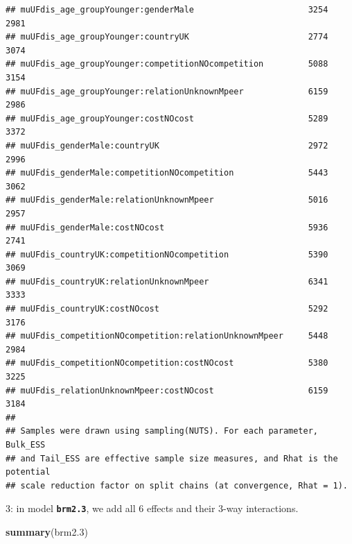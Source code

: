 \documentclass[
]{article}
\newenvironment{Shaded}{\begin{snugshade}}{\end{snugshade}}
\newcommand{\FloatTok}[1]{\textcolor[rgb]{0.00,0.00,0.81}{#1}}
\newcommand{\KeywordTok}[1]{\textcolor[rgb]{0.13,0.29,0.53}{\textbf{#1}}}
\newcommand{\NormalTok}[1]{#1}
\begin{document}
\begin{verbatim}
## muUFdis_age_groupYounger:genderMale                       3254     2981
## muUFdis_age_groupYounger:countryUK                        2774     3074
## muUFdis_age_groupYounger:competitionNOcompetition         5088     3154
## muUFdis_age_groupYounger:relationUnknownMpeer             6159     2986
## muUFdis_age_groupYounger:costNOcost                       5289     3372
## muUFdis_genderMale:countryUK                              2972     2996
## muUFdis_genderMale:competitionNOcompetition               5443     3062
## muUFdis_genderMale:relationUnknownMpeer                   5016     2957
## muUFdis_genderMale:costNOcost                             5936     2741
## muUFdis_countryUK:competitionNOcompetition                5390     3069
## muUFdis_countryUK:relationUnknownMpeer                    6341     3333
## muUFdis_countryUK:costNOcost                              5292     3176
## muUFdis_competitionNOcompetition:relationUnknownMpeer     5448     2984
## muUFdis_competitionNOcompetition:costNOcost               5380     3225
## muUFdis_relationUnknownMpeer:costNOcost                   6159     3184
## 
## Samples were drawn using sampling(NUTS). For each parameter, Bulk_ESS
## and Tail_ESS are effective sample size measures, and Rhat is the potential
## scale reduction factor on split chains (at convergence, Rhat = 1).
\end{verbatim}

3: in model \textbf{\texttt{brm2.3}}, we add all 6 effects and their
3-way interactions.

\begin{Shaded}
\begin{Highlighting}[]
\KeywordTok{summary}\NormalTok{(brm2}\FloatTok{.3}\NormalTok{)}
\end{Highlighting}
\end{Shaded}
\end{document}
